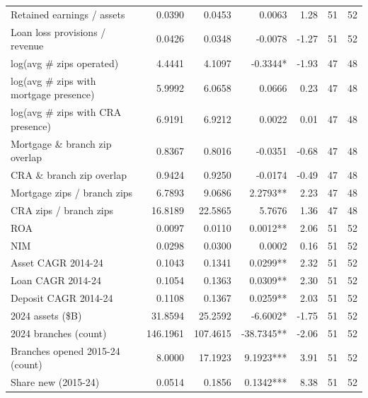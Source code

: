 \begin{tabular}{lrrrrrr}
Retained earnings / assets & 0.0390 & 0.0453 & 0.0063 & 1.28 & 51 & 52 \\
Loan loss provisions / revenue & 0.0426 & 0.0348 & -0.0078 & -1.27 & 51 & 52 \\
log(avg \# zips operated) & 4.4441 & 4.1097 & -0.3344* & -1.93 & 47 & 48 \\
log(avg \# zips with mortgage presence) & 5.9992 & 6.0658 & 0.0666 & 0.23 & 47 & 48 \\
log(avg \# zips with CRA presence) & 6.9191 & 6.9212 & 0.0022 & 0.01 & 47 & 48 \\
Mortgage \& branch zip overlap & 0.8367 & 0.8016 & -0.0351 & -0.68 & 47 & 48 \\
CRA \& branch zip overlap & 0.9424 & 0.9250 & -0.0174 & -0.49 & 47 & 48 \\
Mortgage zips / branch zips & 6.7893 & 9.0686 & 2.2793** & 2.23 & 47 & 48 \\
CRA zips / branch zips & 16.8189 & 22.5865 & 5.7676 & 1.36 & 47 & 48 \\
ROA & 0.0097 & 0.0110 & 0.0012** & 2.06 & 51 & 52 \\
NIM & 0.0298 & 0.0300 & 0.0002 & 0.16 & 51 & 52 \\
Asset CAGR 2014-24 & 0.1043 & 0.1341 & 0.0299** & 2.32 & 51 & 52 \\
Loan CAGR 2014-24 & 0.1054 & 0.1363 & 0.0309** & 2.30 & 51 & 52 \\
Deposit CAGR 2014-24 & 0.1108 & 0.1367 & 0.0259** & 2.03 & 51 & 52 \\
2024 assets (\$B) & 31.8594 & 25.2592 & -6.6002* & -1.75 & 51 & 52 \\
2024 branches (count) & 146.1961 & 107.4615 & -38.7345** & -2.06 & 51 & 52 \\
Branches opened 2015-24 (count) & 8.0000 & 17.1923 & 9.1923*** & 3.91 & 51 & 52 \\
Share new (2015-24) & 0.0514 & 0.1856 & 0.1342*** & 8.38 & 51 & 52 \\
\bottomrule
\end{tabular}

